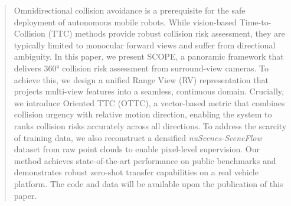 \documentclass[journal]{IEEEtran}
\begin{document}
\maketitle

\begin{abstract}
Omnidirectional collision avoidance is a prerequisite for the safe deployment of autonomous mobile robots. While vision-based Time-to-Collision (TTC) methods provide robust collision risk assessment, they are typically limited to monocular forward views and suffer from directional ambiguity.
In this paper, we present SCOPE, a panoramic framework that delivers 360° collision risk assessment from surround-view cameras. To achieve this, we design a unified Range View (RV) representation that projects multi-view features into a seamless, continuous domain. Crucially, we introduce Oriented TTC (OTTC), a vector-based metric that combines collision urgency with relative motion direction, enabling the system to ranks collision risks accurately across all directions.
To address the scarcity of training data, we also reconstruct a densified \textit{nuScenes-SceneFlow} dataset from raw point clouds to enable pixel-level supervision. Our method achieves state-of-the-art performance on public benchmarks and demonstrates robust zero-shot transfer capabilities on a real vehicle platform. 
The code and data will be available upon the publication of this paper.

\end{abstract}
\end{document}
